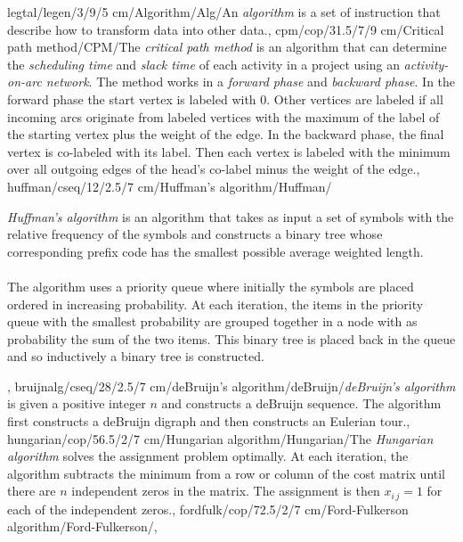 legtal/legen/3/9/5 cm/Algorithm/Alg/{An \emph{algorithm} is a set of instruction that describe how to transform data into other data.},
cpm/cop/31.5/7/9 cm/{Critical path method}/{CPM}/{The \emph{critical path method} is an algorithm that can determine the \emph{scheduling time} and \emph{slack time} of each activity in a project using an \emph{activity-on-arc network}. The method works in a \emph{forward phase} and \emph{backward phase}. In the forward phase the start vertex is labeled with $0$. Other vertices are labeled if all incoming arcs originate from labeled vertices with the maximum of the label of the starting vertex plus the weight of the edge. In the backward phase, the final vertex is co-labeled with its label. Then each vertex is labeled with the minimum over all outgoing edges of the head's co-label minus the weight of the edge.},
huffman/cseq/12/2.5/7 cm/{Huffman's algorithm}/{Huffman}/{\emph{Huffman's algorithm} is an algorithm that takes as input a set of symbols with the relative frequency of the symbols and constructs a binary tree whose corresponding prefix code has the smallest possible average weighted length.\paragraph{}The algorithm uses a priority queue where initially the symbols are placed ordered in increasing probability. At each iteration, the items in the priority queue with the smallest probability are grouped together in a node with as probability the sum of the two items. This binary tree is placed back in the queue and so inductively a binary tree is constructed.},
bruijnalg/cseq/28/2.5/7 cm/{deBruijn's algorithm}/{deBruijn}/{\emph{deBruijn's algorithm} is given a positive integer $n$ and constructs a deBruijn sequence. The algorithm first constructs a deBruijn digraph and then constructs an Eulerian tour.},
hungarian/cop/56.5/2/7 cm/{Hungarian algorithm}/{Hungarian}/{The \emph{Hungarian algorithm} solves the assignment problem optimally. At each iteration, the algorithm subtracts the minimum from a row or column of the cost matrix until there are $n$ independent zeros in the matrix. The assignment is then $x_{i\,j}=1$ for each of the independent zeros.},
fordfulk/cop/72.5/2/7 cm/{Ford-Fulkerson algorithm}/{Ford-Fulkerson}/{},